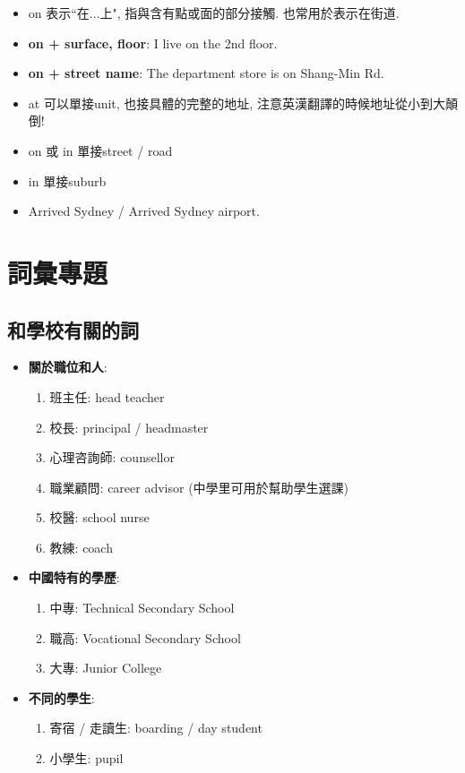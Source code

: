 \begin{itemize}
  \itemsep0em
  \item on 表示``在...上", 指與含有點或面的部分接觸. 也常用於表示在街道.
  \item \textbf{on + surface, floor}: I live on the 2nd floor.
  \item \textbf{on + street name}: The department store is on Shang-Min Rd.
\end{itemize}

\begin{itemize}
  \itemsep0em
  \item at 可以單接unit, 也接具體的完整的地址, 注意英漢翻譯的時候地址從小到大顛倒!
  \item on 或 in 單接street / road
  \item in 單接suburb
  \item Arrived  Sydney / Arrived  Sydney airport.
\end{itemize}

\section{詞彙專題}
\subsection{和學校有關的詞}
\begin{multicols}{2}
\begin{itemize}
  \itemsep0em
  \item \textbf{關於職位和人}:
  \begin{enumerate}
    \itemsep0em
    \item 班主任: head teacher
    \item 校長: principal / headmaster
    \item 心理咨詢師: counsellor
    \item 職業顧問: career advisor (中學里可用於幫助學生選課)
    \item 校醫: school nurse
    \item 教練: coach
  \end{enumerate}
  \item \textbf{中國特有的學歷}:
  \begin{enumerate}
    \itemsep0em
    \item 中專: Technical Secondary School
    \item 職高: Vocational Secondary School
    \item 大專: Junior College
  \end{enumerate}
  \item \textbf{不同的學生}:
  \begin{enumerate}
    \itemsep0em
    \item 寄宿 / 走讀生: boarding / day student
    \item 小學生: pupil
  \end{enumerate}
\end{itemize}
\end{multicols}

